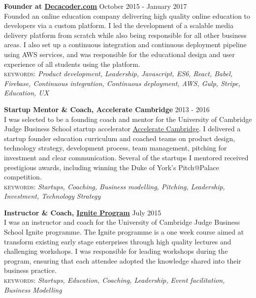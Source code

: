\documentclass[10pt]{article}
\newcommand{\linkto}[2]{\href{#1}{\color{darkblue}\setulcolor{darkblue}\ul{#2}}}
\newcommand{\blankline}{\quad\pagebreak[2]}
\begin{document}
\blankline


\textbf{Founder at \linkto{https://decacoder.com}{Decacoder.com}} \hfill October 2015 - January 2017\\
Founded an online education company delivering high quality online education to developers via a custom platform. I led the development of a scalable media delivery platform from scratch while also being responsible for all other business areas. I also set up a continuous integration and continuous deployment pipeline using AWS services, and was responsible for the educational design and user experience of all students using the platform. \\
{\small \textsc{keywords:} \emph{Product development, Leadership, Javascript, ES6, React, Babel, Firebase, Continuous integration, Continuous deployment, AWS, Gulp, Stripe, Education, UX}}

\blankline

\textbf{Startup Mentor \& Coach, Accelerate Cambridge}  \hfill 2013 - 2016\\
I was selected to be a founding coach and mentor for the University of Cambridge Judge Business School startup accelerator \linkto{https://www.jbs.cam.ac.uk/entrepreneurship/programmes/accelerate-cambridge/programmes/}{Accelerate Cambridge}. I delivered a startup founder education curriculum and coached teams on product design, technology strategy, development process, team management, pitching for investment and clear communication. Several of the startups I mentored received prestigious awards, including winning the Duke of York's Pitch@Palace competition. \\
{\small \textsc{keywords:} \emph{Startups, Coaching, Business modelling, Pitching, Leadership, Investment, Technology Strategy}}

\blankline

\textbf{Instructor \& Coach, \linkto{https://www.jbs.cam.ac.uk/entrepreneurship/programmes/ignite/}{Ignite Program} }  \hfill July 2015\\
I was an instructor and coach for the University of Cambridge Judge Business School Ignite programme. The Ignite programme is a one week course aimed at transform existing early stage enterprises through high quality lectures and challenging workshops. I was responsible for leading workshops during the program, ensuring that each attendee adopted the knowledge shared into their business practice.\\
{\small \textsc{keywords:} \emph{Startups, Education, Coaching, Leadership, Event facilitation, Business Modelling}}
\end{document}
